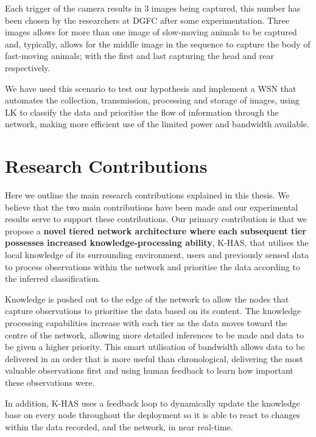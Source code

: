 Each trigger of the camera results in 3 images being captured, this number has been chosen by the researchers at DGFC after some experimentation. Three images allows for more than one image of slow-moving animals to be captured and, typically, allows for the middle image in the sequence to capture the body of fast-moving animals; with the first and last capturing the head and rear respectively.

We have used this scenario to test our hypothesis and implement a WSN that automates the collection, transmission, processing and storage of images, using LK to classify the data and prioritise the flow of information through the network, making more efficient use of the limited power and bandwidth available. 

\section{Research Contributions}

Here we outline the main research contributions explained in this thesis. We believe that the two main contributions have been made and our experimental results serve to support these contributions.
Our primary contribution is that we propose a \textbf{novel tiered network architecture where each subsequent tier possesses increased knowledge-processing ability}, K-HAS, that utilises the local knowledge of its surrounding environment, users and previously sensed data to process observations within the network and prioritise the data according to the inferred classification. 

Knowledge is pushed out to the edge of the network to allow the nodes that capture observations to prioritise the data based on its content. The knowledge processing capabilities increase with each tier as the data moves toward the centre of the network, allowing more detailed inferences to be made and data to be given a higher priority. This smart utilisation of bandwidth allows data to be delivered in an order that is more useful than chronological, delivering the most valuable observations first and using human feedback to learn how important these observations were. 

In addition, K-HAS uses a feedback loop to dynamically update the knowledge base on every node throughout the deployment so it is able to react to changes within the data recorded, and the network, in near real-time.

